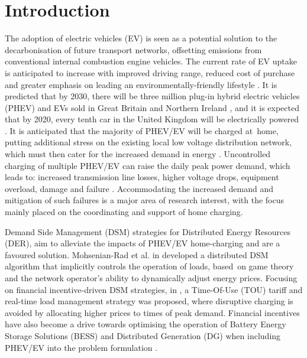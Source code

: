 \section{Introduction}
\label{ch1:sec:introduction}

The adoption of electric vehicles (EV) is seen as a potential solution to the decarbonisation of future transport networks, offsetting emissions from conventional internal combustion engine vehicles. The current rate of EV uptake is anticipated to increase with improved driving range, reduced cost of purchase and greater emphasis on leading an environmentally-friendly lifestyle \cite{Shah2015}. It is predicted that by 2030, there will be three million plug-in hybrid electric vehicles (PHEV) and EVs sold in Great Britain and Northern Ireland \cite{DBER2008}, and it is expected that by 2020, every tenth car in the United Kingdom will be electrically powered \cite{Ecolan2013}. It is anticipated that the majority of PHEV/EV will be charged at~home, putting additional stress on the existing local low voltage distribution network, which must then cater for the increased demand in energy \cite{Clement-Nyns2010, PieltainFernandez2011}. Uncontrolled charging of multiple PHEV/EV can raise the daily peak power demand, which leads to: increased transmission line losses, higher voltage drops, equipment overload, damage and failure \cite{Hadley2009, Putrus2009, Pillai2010, Zhou2014}. Accommodating the increased demand and mitigation of such failures is a major area of research interest, with the focus mainly placed on the coordinating and support of home charging.

Demand Side Management (DSM) strategies for Distributed Energy Resources (DER), aim to alleviate the impacts of PHEV/EV home-charging and are a favoured solution. Mohsenian-Rad et al. in \cite{Mohsenian-Rad2010} developed a distributed DSM algorithm that implicitly controls the operation of loads, based~on game theory and the network operator's ability to dynamically adjust energy prices. Focusing on financial incentive-driven DSM strategies, in \cite{Deilami2011}, a Time-Of-Use (TOU) tariff and real-time load management strategy was proposed, where disruptive charging is avoided by allocating higher prices to times of peak demand. Financial incentives have also become a drive towards optimising the operation of Battery Energy Storage Solutions (BESS) and Distributed Generation (DG) when including PHEV/EV into the problem formulation \cite{Masoum2015}.

